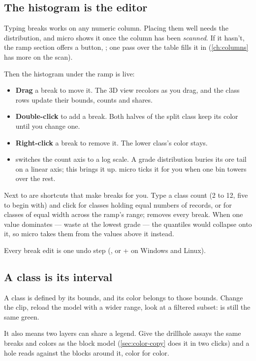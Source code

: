 \subsection{The histogram is the editor}
Typing breaks works on any numeric column. Placing them well needs the distribution, and micro shows it once the column has been \emph{scanned}. If it hasn't, the ramp section offers a button, ; one pass over the table fills it in (\cref{ch:columns} has more on the scan).

Then the histogram under the ramp is live:

\begin{itemize}
\item \textbf{Drag} a break to move it. The 3D view recolors as you drag, and the class rows update their bounds, counts and shares.
\item \textbf{Double-click} to add a break. Both halves of the split class keep its color until you change one.
\item \textbf{Right-click} a break to remove it. The lower class's color stays.
\item {} switches the count axis to a log scale. A grade distribution buries its ore tail on a linear axis; this brings it up. micro ticks it for you when one bin towers over the rest.
\end{itemize}

Next to  are shortcuts that make breaks for you. Type a class count (2 to 12, five to begin with) and click  for classes holding equal numbers of records, or  for classes of equal width across the ramp's range;  removes every break. When one value dominates — waste at the lowest grade — the quantiles would collapse onto it, so micro takes them from the values above it instead.

Every break edit is one undo step (, or + on Windows and Linux).

\subsection{A class is its interval}
A class is defined by its bounds, and its color belongs to those bounds. Change the clip, reload the model with a wider range, look at a filtered subset:  is still the same green.

It also means two layers can share a legend. Give the drillhole assays the same breaks and colors as the block model (\cref{sec:color-copy} does it in two clicks) and a hole reads against the blocks around it, color for color.

